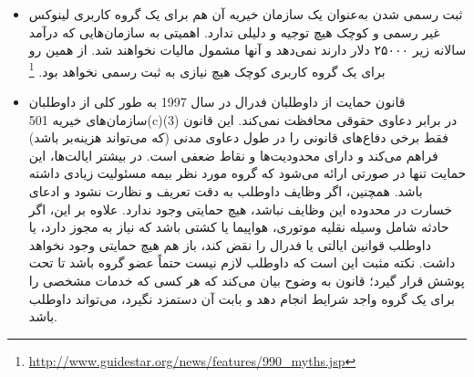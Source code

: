 \begin{itemize}
\item
ثبت رسمی شدن به‌عنوان یک سازمان خیریه آن هم برای یک گروه کاربری لینوکس غیر رسمی و کوچک
هیچ توجیه و دلیلی ندارد.  اهمیتی به سازمان‌هایی که درآمد سالانه زیر ۲۵۰۰۰ دلار دارند نمی‌دهد
و آنها مشمول مالیات نخواهند شد. از همین رو برای یک گروه کاربری کوچک هیچ نیازی به ثبت رسمی نخواهد بود.
\footnote{\url{http://www.guidestar.org/news/features/990_myths.jsp}}

\item
قانون حمایت از داوطلبان فدرال در سال 1997 به طور کلی از داوطلبان سازمان‌های خیریه 501(c)(3) در برابر دعاوی حقوقی محافظت نمی‌کند. این قانون فقط برخی دفاع‌های قانونی را در طول دعاوی مدنی (که می‌تواند هزینه‌بر باشد) فراهم می‌کند و دارای محدودیت‌ها و نقاط ضعفی است. در بیشتر ایالت‌ها، این حمایت تنها در صورتی ارائه می‌شود که گروه مورد نظر بیمه مسئولیت زیادی داشته باشد. همچنین، اگر وظایف داوطلب به دقت تعریف و نظارت نشود و ادعای خسارت در محدوده این وظایف نباشد، هیچ حمایتی وجود ندارد. علاوه بر این، اگر حادثه شامل وسیله نقلیه موتوری، هواپیما یا کشتی باشد که نیاز به مجوز دارد، یا داوطلب قوانین ایالتی یا فدرال را نقض کند، باز هم هیچ حمایتی وجود نخواهد داشت. نکته مثبت این است که داوطلب لازم نیست حتماً عضو گروه باشد تا تحت پوشش قرار گیرد؛ قانون به وضوح بیان می‌کند که هر کسی که خدمات مشخصی را برای یک گروه واجد شرایط انجام دهد و بابت آن دستمزد نگیرد، می‌تواند داوطلب باشد.


\end{itemize}
